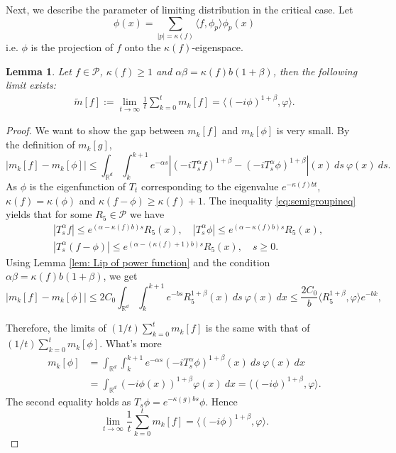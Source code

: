 \documentclass[12pt,oneside,english]{amsart}
\theoremstyle{plain}
\newtheorem{lem}[thm]{Lemma}
\theoremstyle{definition}
\numberwithin{equation}{section}
\begin{document}
Next, we describe the parameter of limiting distribution in the critical case. Let
$$\phi(x)=\sum_{|p|=\kappa(f)}\langle f, \phi_p\rangle\phi_p(x)$$
i.e. $\phi$ is the projection of $f$ onto the $\kappa(f)$-eigenspace.
\begin{lem}\label{lemma210}
Let $f \in \mathcal{P}$, $\kappa(f)\geq 1$ and $\alpha\beta=\kappa(f)b(1+\beta)$, then the following limit exists:
\begin{align}
    \tilde{m}[f]:=\lim_{t\rightarrow \infty}\frac{1}{t}\sum_{k=0}^{t}m_k[f]=\langle(-i\phi)^{1+\beta},\varphi\rangle.
\end{align}
\end{lem}

\begin{proof}
    We want to show the gap between $m_k[f]$ and $m_k[\phi]$ is very small. By the definition of $m_k[g]$,
    $$|m_k[f]-m_k[\phi]|\leq\int_{\mathbb{R}^d}\int_k^{k+1}e^{-\alpha s}\left|(-i T^{\alpha}_s f)^{1+\beta}-(-i T^{\alpha}_s \phi)^{1+\beta}\right|(x)~ds~\varphi(x)~ds.$$
    As $\phi$ is the eigenfunction of $T_t$ corresponding to the eigenvalue $e^{-\kappa(f)bt}$,  $\kappa(f)=\kappa(\phi)$ and $\kappa(f-\phi)\geq \kappa(f)+1$. The inequality \eqref{eq:semigroupineq} yields that for some $R_5\in\mathcal{P}$ we have
    \begin{align*}
        &|T_s^{\alpha}f|\leq e^{(\alpha-\kappa(f)b)s}R_5(x), \quad|T_s^{\alpha}\phi|\leq e^{(\alpha-\kappa(f)b)s}R_5(x), \\
        &|T_s^{\alpha}(f-\phi)|\leq e^{(\alpha-(\kappa(f)+1)b)s}R_5(x), \quad s\geq0.
    \end{align*}
  Using Lemma \ref{lem: Lip of power function} and the condition $\alpha\beta=\kappa(f)b(1+\beta)$, we get
    $$|m_k[f]-m_k[\phi]|\leq2C_0\int_{\mathbb{R}^d}\int_k^{k+1}e^{-bs}R_5^{1+\beta}(x)~ds~\varphi(x)~dx\leq \frac{2C_0}{b}\langle R_5^{1+\beta},\varphi\rangle e^{-bk},$$

    Therefore, the limits of $(1/t)\sum_{k=0}^tm_k[f]$ is the same with that of $(1/t)\sum_{k=0}^tm_k[\phi]$. What's more
    \begin{align*}
        m_k[\phi]&=\int_{\mathbb{R}^d}\int_k^{k+1} e^{-\alpha s}(-iT_{s}^{\alpha}\phi)^{1+\beta}(x)~ds~\varphi(x)~dx\\
        &=\int_{\mathbb{R}^d}(-i\phi(x))^{1+\beta}\varphi (x)~dx=\langle (-i\phi)^{1+\beta},\varphi\rangle.
    \end{align*}
    The second equality holds as $T_s\phi=e^{-\kappa(g)bs}\phi$. Hence
    $$\lim_{t\rightarrow \infty}\frac{1}{t}\sum_{k=0}^{t}m_k[f]=\langle(-i\phi)^{1+\beta},\varphi\rangle.$$
\end{proof}
\end{document}
